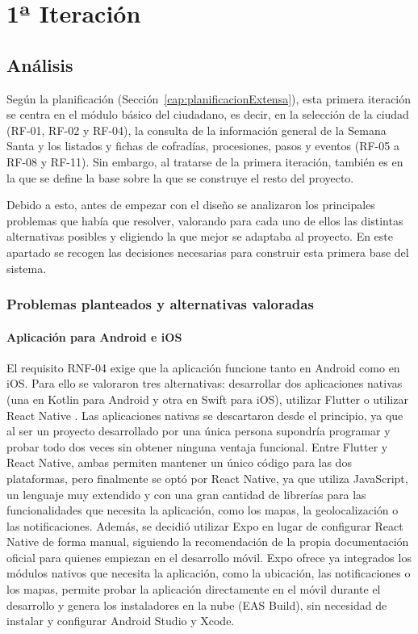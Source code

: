 \section{1ª Iteración}\label{cap:1_iteracion}

\subsection{Análisis}

Según la planificación (Sección~\ref{cap:planificacionExtensa}), esta primera iteración se centra en el módulo básico del ciudadano, es decir, en la selección de la ciudad (RF-01, RF-02 y RF-04), la consulta de la información general de la Semana Santa y los listados y fichas de cofradías, procesiones, pasos y eventos (RF-05 a RF-08 y RF-11). Sin embargo, al tratarse de la primera iteración, también es en la que se define la base sobre la que se construye el resto del proyecto.

Debido a esto, antes de empezar con el diseño se analizaron los principales problemas que había que resolver, valorando para cada uno de ellos las distintas alternativas posibles y eligiendo la que mejor se adaptaba al proyecto. En este apartado se recogen las decisiones necesarias para construir esta primera base del sistema.

\subsubsection{Problemas planteados y alternativas valoradas}\label{sec:decisionesTecnologicas}

\paragraph{Aplicación para Android e iOS}
El requisito RNF-04 exige que la aplicación funcione tanto en Android como en iOS. Para ello se valoraron tres alternativas: desarrollar dos aplicaciones nativas (una en Kotlin para Android y otra en Swift para iOS), utilizar Flutter o utilizar React Native \cite{reactnative}. Las aplicaciones nativas se descartaron desde el principio, ya que al ser un proyecto desarrollado por una única persona supondría programar y probar todo dos veces sin obtener ninguna ventaja funcional. Entre Flutter y React Native, ambas permiten mantener un único código para las dos plataformas, pero finalmente se optó por React Native, ya que utiliza JavaScript, un lenguaje muy extendido y con una gran cantidad de librerías para las funcionalidades que necesita la aplicación, como los mapas, la geolocalización o las notificaciones. Además, se decidió utilizar Expo \cite{expo} en lugar de configurar React Native de forma manual, siguiendo la recomendación de la propia documentación oficial para quienes empiezan en el desarrollo móvil. Expo ofrece ya integrados los módulos nativos que necesita la aplicación, como la ubicación, las notificaciones o los mapas, permite probar la aplicación directamente en el móvil durante el desarrollo y genera los instaladores en la nube (EAS Build), sin necesidad de instalar y configurar Android Studio y Xcode.

